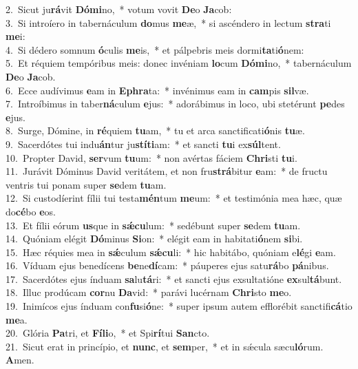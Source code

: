 {2.~}Sicut ju\textbf{rá}vit \textbf{Dó}\textbf{mi}no,~* votum vovit \textbf{De}o \textbf{Ja}cob:\\
{3.~}Si introíero in tabernáculum \textbf{do}mus \textbf{me}æ,~* si ascéndero in lectum \textbf{stra}ti \textbf{me}i:\\
{4.~}Si dédero somnum \textbf{ó}culis \textbf{me}is,~* et pálpebris meis dormi\textbf{ta}ti\textbf{ó}nem:\\
{5.~}Et réquiem tempóribus meis: donec invéniam \textbf{lo}cum \textbf{Dó}\textbf{mi}no,~* tabernáculum \textbf{De}o \textbf{Ja}cob.\\
{6.~}Ecce audívimus \textbf{e}am in \textbf{E}\textbf{phra}ta:~* invénimus eam in \textbf{cam}pis \textbf{sil}væ.\\
{7.~}Introíbimus in taber\textbf{ná}culum \textbf{e}jus:~* adorábimus in loco, ubi stetérunt \textbf{pe}des \textbf{e}jus.\\
{8.~}Surge, Dómine, in \textbf{ré}quiem \textbf{tu}am,~* tu et arca sanctificati\textbf{ó}nis \textbf{tu}æ.\\
{9.~}Sacerdótes tui indu\textbf{án}tur ju\textbf{stí}\textbf{ti}am:~* et sancti \textbf{tu}i ex\textbf{súl}tent.\\
{10.~}Propter David, \textbf{ser}vum \textbf{tu}um:~* non avértas fáciem \textbf{Chri}sti \textbf{tu}i.\\
{11.~}Jurávit Dóminus David veritátem, et non fru\textbf{strá}bitur \textbf{e}am:~* de fructu ventris tui ponam super \textbf{se}dem \textbf{tu}am.\\
{12.~}Si custodíerint fílii tui testa\textbf{mén}tum \textbf{me}um:~* et testimónia mea hæc, quæ do\textbf{cé}bo \textbf{e}os.\\
{13.~}Et fílii eórum \textbf{us}que in \textbf{sǽ}\textbf{cu}lum:~* sedébunt super \textbf{se}dem \textbf{tu}am.\\
{14.~}Quóniam elégit \textbf{Dó}minus \textbf{Si}on:~* elégit eam in habitati\textbf{ó}nem \textbf{si}bi.\\
{15.~}Hæc réquies mea in \textbf{sǽ}culum \textbf{sǽ}\textbf{cu}li:~* hic habitábo, quóniam e\textbf{lé}gi \textbf{e}am.\\
{16.~}Víduam ejus benedícens \textbf{be}ne\textbf{dí}cam:~* páuperes ejus satu\textbf{rá}bo \textbf{pá}nibus.\\
{17.~}Sacerdótes ejus índuam \textbf{sa}lu\textbf{tá}ri:~* et sancti ejus exsultatióne \textbf{ex}sul\textbf{tá}bunt.\\
{18.~}Illuc prodúcam \textbf{cor}nu \textbf{Da}vid:~* parávi lucérnam \textbf{Chri}sto \textbf{me}o.\\
{19.~}Inimícos ejus índuam con\textbf{fu}si\textbf{ó}ne:~* super ipsum autem efflorébit sanctifi\textbf{cá}tio \textbf{me}a.\\
{20.~}Glória \textbf{Pa}tri, et \textbf{Fí}\textbf{li}o,~* et Spi\textbf{rí}tui \textbf{San}cto.\\
{21.~}Sicut erat in princípio, et \textbf{nunc}, et \textbf{sem}per,~* et in sǽcula sæcu\textbf{ló}rum. \textbf{A}men.\\
